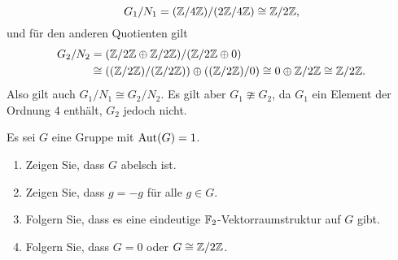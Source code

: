 \begin{solution}
\begin{enumerate}
      \[
              G_1 / N_1
        =     (\mathbb{Z}/4\mathbb{Z}) / (2\mathbb{Z}/4\mathbb{Z})
        \cong \mathbb{Z}/2\mathbb{Z},
      \]
      und für den anderen Quotienten gilt
      \begin{align*}
                G_2 / N_2
        &=      (\mathbb{Z}/2\mathbb{Z} \oplus \mathbb{Z}/2\mathbb{Z}) / (\mathbb{Z}/2\mathbb{Z} \oplus 0)
        \\
        &\cong  ((\mathbb{Z}/2\mathbb{Z})/(\mathbb{Z}/2\mathbb{Z})) \oplus ((\mathbb{Z}/2\mathbb{Z})/0)
        \cong   0 \oplus \mathbb{Z}/2\mathbb{Z}
        \cong   \mathbb{Z}/2\mathbb{Z}.
      \end{align*}
      Also gilt auch $G_1/N_1 \cong G_2/N_2$.
      Es gilt aber $G_1 \ncong G_2$, da $G_1$ ein Element der Ordnung $4$ enthält, $G_2$ jedoch nicht.
  \end{enumerate}
\end{solution}



\begin{question}
  Es sei $G$ eine Gruppe mit $\operatorname{Aut}(G) = 1$.
  \begin{enumerate}
    \item
      Zeigen Sie, dass $G$ abelsch ist.
    \item
      Zeigen Sie, dass $g = -g$ für alle $g \in G$.
    \item
      Folgern Sie, dass es eine eindeutige $\mathbb{F}_2$-Vektorraumstruktur auf $G$ gibt.
    \item
      Folgern Sie, dass $G = 0$ oder $G \cong \mathbb{Z} / 2 \mathbb{Z}$.
  \end{enumerate}
\end{question}


